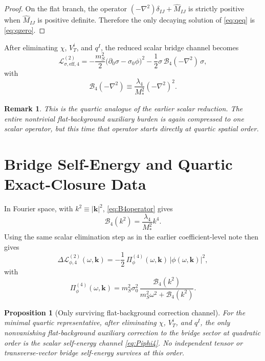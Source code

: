 \documentclass[11pt]{article}
\newtheorem{proposition}{Proposition}
\newtheorem{remark}{Remark}
\begin{document}
\begin{proof}
On the flat branch, the operator \((-\nabla^2)\delta_{IJ}+\widehat M_{IJ}\) is strictly positive when \(\widehat M_{IJ}\) is positive definite. Therefore the only decaying solution of \eqref{eq:qeq} is \eqref{eq:qzero}.
\end{proof}

After eliminating \(\chi\), \(V_T^i\), and \(q^I\), the reduced scalar bridge channel becomes
\begin{equation}
\mathcal L_{\sigma,\mathrm{eff},4}^{(2)}
=
-\frac{m_S^2}{2}\bigl(\partial_0\sigma-\sigma_0\phi\bigr)^2
-\frac{1}{2}\sigma\,\mathcal B_4(-\nabla^2)\,\sigma,
\label{eq:Lsigmaeff4}
\end{equation}
with
\begin{equation}
\mathcal B_4(-\nabla^2)
\equiv
\frac{\lambda_4}{M_*^2}(-\nabla^2)^2.
\label{eq:B4operator}
\end{equation}

\begin{remark}
This is the quartic analogue of the earlier scalar reduction. The entire nontrivial flat-background auxiliary burden is again compressed to one scalar operator, but this time that operator starts directly at quartic spatial order.
\end{remark}

\section{Bridge Self-Energy and Quartic Exact-Closure Data}

In Fourier space, with \(k^2\equiv |\mathbf{k}|^2\), \eqref{eq:B4operator} gives
\begin{equation}
\mathcal B_4(k^2)
=
\frac{\lambda_4}{M_*^2}k^4.
\label{eq:B4k}
\end{equation}
Using the same scalar elimination step as in the earlier coefficient-level note then gives
\begin{equation}
\Delta\mathcal L_{\phi,4}^{(2)}(\omega,\mathbf{k})
=
-\frac{1}{2}\,
\Pi_\phi^{(4)}(\omega,\mathbf{k})\,|\phi(\omega,\mathbf{k})|^2,
\label{eq:Deltaphi4}
\end{equation}
with
\begin{equation}
\Pi_\phi^{(4)}(\omega,\mathbf{k})
=
m_S^2\sigma_0^2\,
\frac{\mathcal B_4(k^2)}
{m_S^2\omega^2+\mathcal B_4(k^2)}.
\label{eq:Piphi4}
\end{equation}

\begin{proposition}[Only surviving flat-background correction channel]
For the minimal quartic representative, after eliminating \(\chi\), \(V_T^i\), and \(q^I\), the only nonvanishing flat-background auxiliary correction to the bridge sector at quadratic order is the scalar self-energy channel \eqref{eq:Piphi4}. No independent tensor or transverse-vector bridge self-energy survives at this order.
\end{proposition}
\end{document}
